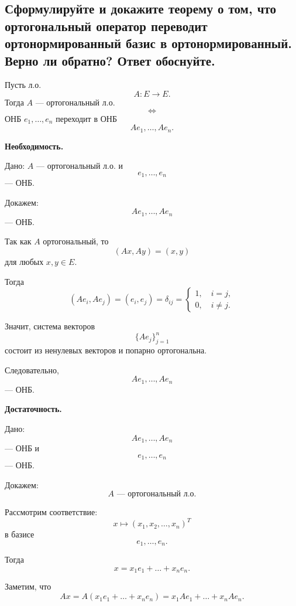 \subsection{Сформулируйте и докажите теорему о том, что ортогональный оператор переводит ортонормированный базис в ортонормированный. Верно ли обратно? Ответ обоснуйте.}

\begin{theorem}
    Пусть л.о.
    \[
        A: E \to E.
    \]
    Тогда $A$ --- ортогональный л.о.
    \[
        \Longleftrightarrow
    \]
    ОНБ $e_1,\ldots,e_n$ переходит в ОНБ
    \[
        Ae_1,\ldots,Ae_n.
    \]
\end{theorem}

\begin{Proof}
    {\bf Необходимость.}

    Дано: $A$ --- ортогональный л.о. и
    \[
        e_1,\ldots,e_n
    \]
    --- ОНБ.

    Докажем:
    \[
        Ae_1,\ldots,Ae_n
    \]
    --- ОНБ.

    Так как $A$ ортогональный, то
    \[
        (Ax,Ay) = (x,y)
    \]
    для любых $x,y \in E$.

    Тогда
    \[
        (Ae_i,Ae_j) = (e_i,e_j) = \delta_{ij}
        =
        \begin{cases}
            1,\quad i=j,\\
            0,\quad i\neq j.
        \end{cases}
    \]

    Значит, система векторов
    \[
        \{Ae_j\}_{j=1}^{n}
    \]
    состоит из ненулевых векторов и попарно ортогональна.

    Следовательно,
    \[
        Ae_1,\ldots,Ae_n
    \]
    --- ОНБ.

    \bigskip

    {\bf Достаточность.}

    Дано:
    \[
        Ae_1,\ldots,Ae_n
    \]
    --- ОНБ и
    \[
        e_1,\ldots,e_n
    \]
    --- ОНБ.

    Докажем:
    \[
        A \text{ --- ортогональный л.о.}
    \]

    Рассмотрим соответствие:
    \[
        x \mapsto (x_1,x_2,\ldots,x_n)^T
    \]
    в базисе
    \[
        e_1,\ldots,e_n.
    \]

    Тогда
    \[
        x=x_1e_1+\ldots+x_ne_n.
    \]

    Заметим, что
    \[
        Ax
        =
        A(x_1e_1+\ldots+x_ne_n)
        =
        x_1Ae_1+\ldots+x_nAe_n.
    \]


\end{Proof}
